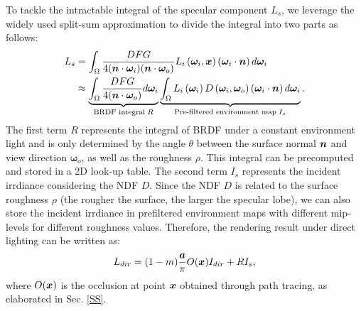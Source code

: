 \documentclass{article} %
\begin{document}
To tackle the intractable integral of the specular component $L_s$, we leverage the widely used split-sum approximation \citep{split} to divide the integral into two parts as follows:
\begin{equation}
\begin{aligned}
L_s&=\int_{\Omega} \frac{D F G}{4(\boldsymbol{n} \cdot \boldsymbol{\omega}_i)(\boldsymbol{n} \cdot \boldsymbol{\omega}_o)} L_i\left(\boldsymbol{\omega}_i, {\bm{x}}\right)\left(\boldsymbol{\omega}_i \cdot {\bm{n}}\right) d \boldsymbol{\omega}_i\\
&\approx \underbrace{\int_{\Omega} \frac{D F G}{4(\boldsymbol{n} \cdot \boldsymbol{\omega}_o)} d \boldsymbol{\omega}_i}_{\text {BRDF integral}\; R} \underbrace{\int_{\Omega} L_i\left(\boldsymbol{\omega}_i\right) D\left(\boldsymbol{\omega}_i, \boldsymbol{\omega}_o\right)\left(\boldsymbol{\omega}_i \cdot \boldsymbol{n}\right) d \boldsymbol{\omega}_i}_{\text {Pre-filtered environment map}\; I_s}.
\end{aligned} 
\end{equation}
The first term $R$ represents the integral of BRDF under a constant environment light and is only determined by the angle $\theta$ between the surface normal ${\bm{n}}$ and view direction $\bm{\omega}_o$, as well as the roughness $\rho$. This integral can be precomputed and stored in a 2D look-up table. The second term $I_s$ represents the incident irrdiance considering the NDF $D$. Since the NDF $D$ is related to the surface roughness $\rho$ (the rougher the surface, the larger the specular lobe), we can also store the incident irrdiance in prefiltered environment maps with different mip-levels for different roughness values. Therefore, the rendering result under direct lighting can be written as:
\begin{equation}
    L_{dir} = (1-m) \frac{\boldsymbol{a}}{\pi} O({\bm{x}}) I_{dir} + RI_s,
\end{equation}
where $O({\bm{x}})$ is the occlusion at point ${\bm{x}}$ obtained through path tracing, as elaborated in Sec. \ref{SS}.
\end{document}
